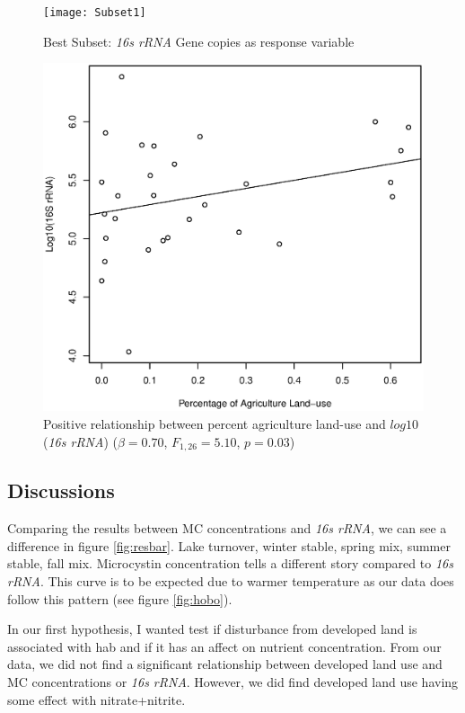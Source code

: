 \begin{figure}[!ht]
  \texttt{[image: Subset1]}
  \caption{Best Subset: \emph{16s rRNA} Gene copies as response variable}
  \label{subset2}
\end{figure}

\begin{figure}[!ht]
  \includegraphics[width=\textwidth]{figures/Agriculture}
  \caption{Positive relationship between percent agriculture land-use and $log10$(\emph{16s rRNA}) ($\beta=0.70$, $F_{{1,26}}=5.10$, $p=0.03$)}
  \label{fig:agriculture}
\end{figure}
\clearpage

\subsection{Discussions}

Comparing the results between MC concentrations and \emph{16s rRNA}, we can see a difference in figure \ref{fig:resbar}.
Lake turnover, winter stable, spring mix, summer stable, fall mix. 
Microcystin concentration tells a different story compared to \emph{16s rRNA}. This curve is to be expected due to warmer temperature as our data does follow this pattern (see figure \ref{fig:hobo}).

In our first hypothesis, I wanted test if disturbance from developed land is associated with \gls{hab} and if it has an affect on nutrient concentration.  From our data, we did not find a significant relationship between developed land use and MC concentrations or \emph{16s rRNA}. However, we did find developed land use having some effect with nitrate+nitrite.


